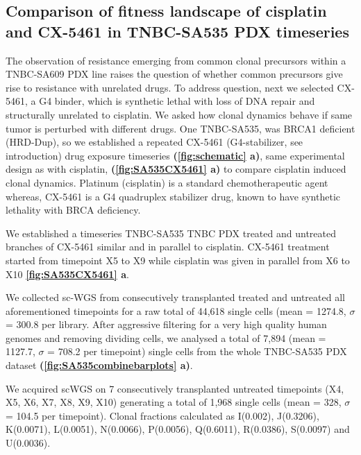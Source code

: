 
\subsection{Comparison of fitness landscape of cisplatin and CX-5461 in TNBC-SA535 PDX timeseries}
The observation of resistance emerging from common clonal precursors within a TNBC-SA609 PDX line raises the question of whether common precursors give rise to resistance with unrelated drugs. To address question, next we  selected CX-5461, a G4 binder, which is synthetic lethal with loss of DNA repair and structurally unrelated to cisplatin. We asked how clonal dynamics behave if same tumor is perturbed with different drugs. 
One TNBC-SA535, was BRCA1 deficient (HRD-Dup), so we established a repeated CX-5461 (G4-stabilizer, see introduction) drug exposure timeseries \textbf{(\autoref{fig:schematic} a)}, same experimental design as with cisplatin, \textbf{(\autoref{fig:SA535CX5461} a)} to compare cisplatin induced clonal dynamics. Platinum (cisplatin) is a standard chemotherapeutic agent whereas, CX-5461 is a G4 quadruplex stabilizer drug, known to have synthetic lethality with BRCA deficiency.

We established a timeseries TNBC-SA535 TNBC PDX treated and untreated branches of CX-5461 similar and in parallel to cisplatin.
 CX-5461 treatment started from timepoint X5 to X9 while cisplatin was given in parallel from X6 to X10 \textbf{\autoref{fig:SA535CX5461} a}. 
 
We collected sc-WGS from consecutively transplanted treated and untreated all aforementioned timepoints for a raw total of 44,618 single cells (mean = 1274.8, $\sigma$ = 300.8 per library. After aggressive filtering for a very high quality human genomes and removing dividing cells, we analysed a total of 7,894 (mean = 1127.7, $\sigma$ = 708.2 per timepoint) single cells from the whole TNBC-SA535 PDX dataset \textbf{(\autoref{fig:SA535combinebarplots} a)}.

We acquired scWGS on 7 consecutively transplanted untreated timepoints (X4, X5, X6, X7, X8, X9, X10) generating a total of 1,968 single cells (mean = 328, $\sigma$ = 104.5 per timepoint).
Clonal fractions calculated as I(0.002), J(0.3206), K(0.0071), L(0.0051), N(0.0066), P(0.0056), Q(0.6011), R(0.0386), S(0.0097) and U(0.0036). 


